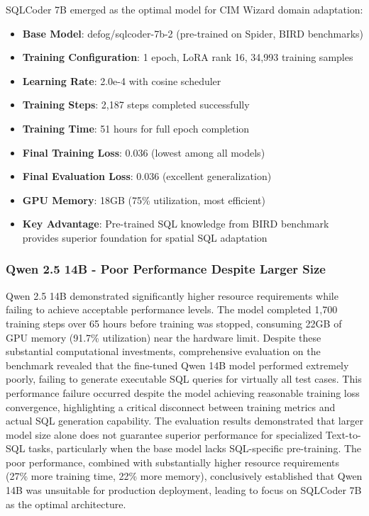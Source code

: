 SQLCoder 7B emerged as the optimal model for CIM Wizard domain adaptation:

\begin{itemize}[leftmargin=1.2em]
  \item \textbf{Base Model}: defog/sqlcoder-7b-2 (pre-trained on Spider, BIRD benchmarks)
  \item \textbf{Training Configuration}: 1 epoch, LoRA rank 16, 34,993 training samples
  \item \textbf{Learning Rate}: 2.0e-4 with cosine scheduler
  \item \textbf{Training Steps}: 2,187 steps completed successfully
  \item \textbf{Training Time}: 51 hours for full epoch completion
  \item \textbf{Final Training Loss}: 0.036 (lowest among all models)
  \item \textbf{Final Evaluation Loss}: 0.036 (excellent generalization)
  \item \textbf{GPU Memory}: 18GB (75\% utilization, most efficient)
  \item \textbf{Key Advantage}: Pre-trained SQL knowledge from BIRD benchmark provides superior foundation for spatial SQL adaptation
\end{itemize}

\subsubsection{Qwen 2.5 14B - Poor Performance Despite Larger Size}

Qwen 2.5 14B demonstrated significantly higher resource requirements while failing to achieve acceptable performance levels. The model completed 1,700 training steps over 65 hours before training was stopped, consuming 22GB of GPU memory (91.7\% utilization) near the hardware limit. Despite these substantial computational investments, comprehensive evaluation on the benchmark revealed that the fine-tuned Qwen 14B model performed extremely poorly, failing to generate executable SQL queries for virtually all test cases. This performance failure occurred despite the model achieving reasonable training loss convergence, highlighting a critical disconnect between training metrics and actual SQL generation capability. The evaluation results demonstrated that larger model size alone does not guarantee superior performance for specialized Text-to-SQL tasks, particularly when the base model lacks SQL-specific pre-training. The poor performance, combined with substantially higher resource requirements (27\% more training time, 22\% more memory), conclusively established that Qwen 14B was unsuitable for production deployment, leading to focus on SQLCoder 7B as the optimal architecture.

